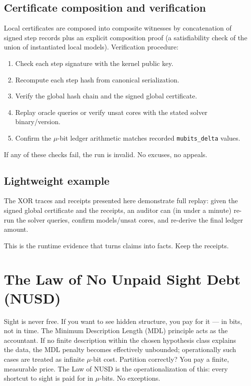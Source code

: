 \documentclass[11pt]{article}
\begin{document}
\subsection{Certificate composition and verification}
Local certificates are composed into composite witnesses by concatenation of signed step records plus an explicit composition proof (a satisfiability check of the union of instantiated local models). Verification procedure:
\begin{enumerate}
  \item Check each step signature with the kernel public key.
  \item Recompute each step hash from canonical serialization.
  \item Verify the global hash chain and the signed global certificate.
  \item Replay oracle queries or verify unsat cores with the stated solver binary/version.
  \item Confirm the $\mu$-bit ledger arithmetic matches recorded \texttt{mubits\_delta} values.
  \end{enumerate}

If any of these checks fail, the run is invalid. No excuses, no appeals.

\subsection{Lightweight example}
The XOR traces and receipts presented here demonstrate full replay: given the signed global certificate and the receipts, an auditor can (in under a minute) re-run the solver queries, confirm models/unsat cores, and re-derive the final ledger amount.

This is the runtime evidence that turns claims into facts. Keep the receipts.

\section{The Law of No Unpaid Sight Debt (NUSD)}
Sight is never free. If you want to see hidden structure, you pay for it — in bits, not in time. The Minimum Description Length (MDL) principle acts as the accountant. If no finite description within the chosen hypothesis class explains the data, the MDL penalty becomes effectively unbounded; operationally such cases are treated as infinite $\mu$-bit cost. Partition correctly? You pay a finite, measurable price. The Law of NUSD is the operationalization of this: every shortcut to sight is paid for in $\mu$-bits. No exceptions.
\end{document}
